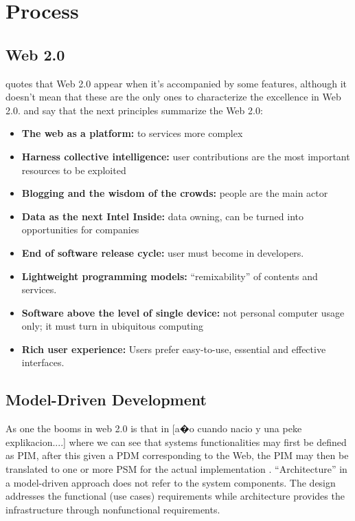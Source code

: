 \documentclass[a4paper]{memoir}
\begin{document}
\chapter{Process}
\label{chap:Process}
	\section{Web 2.0}
	\cite{O'Reilly2007} quotes that Web 2.0 appear when it's accompanied by some features, although  it doesn't mean that these are the only ones to characterize the excellence in Web 2.0.
	\cite{O'Reilly2007} and \cite{Frattini2007} say that the next principles summarize the Web 2.0:
	\begin{itemize}
		\item \textbf{The web as a platform:} to services more complex
		\item \textbf{Harness collective intelligence:} user contributions are the most important resources to be exploited
		\item \textbf{Blogging and the wisdom of the crowds:} people are the main actor
		\item \textbf{Data as the next Intel Inside:} data owning, can be turned into opportunities for companies
		\item \textbf{End of software release cycle:} user must become in developers.
		\item \textbf{Lightweight programming models:} ``remixability'' of contents and services.
		\item \textbf{Software above the level of single device:} not personal computer usage only; it must turn in ubiquitous computing
		\item \textbf{Rich user experience:} Users prefer easy-to-use, essential and effective interfaces.
	\end{itemize}
	
	\section{Model-Driven Development}
	As one the booms in web 2.0 is that in [a�o cuando nacio y una peke explikacion....] where we can see that systems functionalities may first be defined as \ac{PIM}, after this given a \ac{PDM} corresponding to the Web, the \ac{PIM} may then be translated to one or more \ac{PSM} for the actual implementation \cite{Frattini2007}.
	``Architecture'' in a model-driven approach does not refer to the system components.
	The design addresses the functional (use cases) requirements while architecture provides the infrastructure through nonfunctional requirements.
\end{document}
